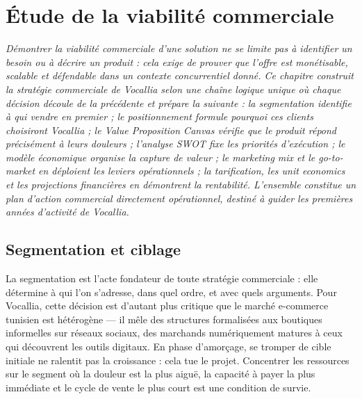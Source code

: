 \chapter{Étude de la viabilité commerciale}
\label{Chapitre_3}

\textit{Démontrer la viabilité commerciale d'une solution ne se limite pas à identifier un besoin ou à décrire un produit : cela exige de prouver que l'offre est monétisable, scalable et défendable dans un contexte concurrentiel donné. Ce chapitre construit la stratégie commerciale de Vocallia selon une chaîne logique unique où chaque décision découle de la précédente et prépare la suivante : la segmentation identifie à qui vendre en premier ; le positionnement formule pourquoi ces clients choisiront Vocallia ; le Value Proposition Canvas vérifie que le produit répond précisément à leurs douleurs ; l'analyse SWOT fixe les priorités d'exécution ; le modèle économique organise la capture de valeur ; le marketing mix et le go-to-market en déploient les leviers opérationnels ; la tarification, les unit economics et les projections financières en démontrent la rentabilité. L'ensemble constitue un plan d'action commercial directement opérationnel, destiné à guider les premières années d'activité de Vocallia.}

\section{Segmentation et ciblage}
\label{section3.1}

La segmentation est l'acte fondateur de toute stratégie commerciale : elle détermine à qui l'on s'adresse, dans quel ordre, et avec quels arguments. Pour Vocallia, cette décision est d'autant plus critique que le marché e-commerce tunisien est hétérogène --- il mêle des structures formalisées aux boutiques informelles sur réseaux sociaux, des marchands numériquement matures à ceux qui découvrent les outils digitaux. En phase d'amorçage, se tromper de cible initiale ne ralentit pas la croissance : cela tue le projet. Concentrer les ressources sur le segment où la douleur est la plus aiguë, la capacité à payer la plus immédiate et le cycle de vente le plus court est une condition de survie.


